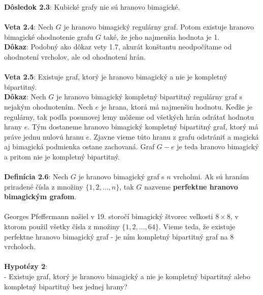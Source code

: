 \documentclass[12pt]{article}
\begin{document}
\textbf{Dôsledok 2.3}: Kubické grafy nie sú hranovo bimagické. \\\\

\textbf{Veta 2.4}: Nech $G$ je hranovo bimagický regulárny graf. Potom existuje hranovo bimagické ohodnotenie grafu $G$ také, že jeho najmenšia hodnota je 1. \\

\textbf{Dôkaz}: Podobný ako dôkaz vety 1.7, akurát konštantu neodpočítame od ohodnotení vrcholov, ale od ohodnotení hrán. \\\\

\textbf{Veta 2.5}: Existuje graf, ktorý je hranovo bimagický a nie je kompletný bipartitný. \\

\textbf{Dôkaz}: Nech $G$ je hranovo bimagický kompletný bipartitný regulárny graf s nejakým ohodnotením. Nech $e$ je hrana, ktorá má najmenšiu hodnotu. Keďže je regulárny, tak podľa posunovej lemy môžeme od všetkých hrán odrátať hodnotu hrany $e$. Tým dostaneme hranovo bimagický kompletný bipartitný graf, ktorý má práve jednu nulovú hranu $e$. Zjavne vieme túto hranu z grafu odstrániť a magická aj bimagická podmienka ostane zachovaná. Graf $G - e$ je teda hranovo bimagický a pritom nie je kompletný bipartitný. \\\\

\textbf{Definícia 2.6}: Nech $G$ je hranovo bimagický graf s $n$ vrcholmi. Ak sú hranám priradené čísla z množiny $\{1, 2, ... , n\}$, tak $G$ nazveme \textbf{perfektne hranovo bimagickým grafom}. \\\\

Georges Pfeffermann našiel v 19. storočí bimagický štvorec veľkosti $8 \times 8$, v ktorom použil všetky čísla z množiny $\{1, 2, ... , 64\}$. Vieme teda, že existuje perfektne hranovo bimagický graf - je ním kompletný bipartitný graf na $8$ vrcholoch. \\\\

\textbf{Hypotézy 2}: \\
- Existuje graf, ktorý je hranovo bimagický a nie je kompletný bipartitný alebo kompletný bipartitný bez jednej hrany? \\\\
\end{document}
